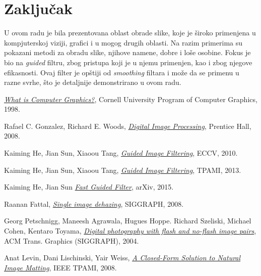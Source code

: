 \documentclass[a4paper,12pt,titlepage]{article}
\begin{document}
\section{Zaključak}%

U ovom radu je bila prezentovana oblast obrade slike, koje je široko primenjena u kompjuterskoj viziji, grafici i u mogog drugih oblasti. Na razim primerima su pokazani metodi za obradu slike, njihove namene, dobre i loše osobine. Fokus je bio na \emph{guided} filtru, zbog pristupa koji je u njemu primenjen, kao i zbog njegove efikasnosti. Ovaj filter je opštiji od \emph{smoothing} filtara i može da se primenu u razne svrhe, što je detaljnije demonstrirano u ovom radu.

\newpage
{}
\begin{thebibliography}{10}

\emph{\href{http://www.graphics.cornell.edu/online/tutorial/}{What is Computer Graphics?}},
Cornell University Program of Computer Graphics,
1998.

Rafael C. Gonzalez, Richard E. Woods,
\emph{\href{https://books.google.rs/books?id=8uGOnjRGEzoC&redir_esc=y}{Digital Image Processing}},
Prentice Hall,
2008.

Kaiming He, Jian Sun, Xiaoou Tang,
\emph{\href{http://kaiminghe.com/publications/eccv10guidedfilter.pdf}{Guided Image Filtering}},
ECCV,
2010.

Kaiming He, Jian Sun, Xiaoou Tang,
\emph{\href{http://kaiminghe.com/publications/pami12guidedfilter.pdf}{Guided Image Filtering}},
TPAMI,
2013.

Kaiming He, Jian Sun
\emph{\href{https://arxiv.org/pdf/1505.00996.pdf}{Fast Guided Filter}},
arXiv,
2015.

Raanan Fattal,
\emph{\href{http://citeseerx.ist.psu.edu/viewdoc/download?doi=10.1.1.456.2558&rep=rep1&type=pdf}{Single image dehazing}},
SIGGRAPH,
2008.

Georg Petschnigg, Maneesh Agrawala, Hugues Hoppe. Richard Szeliski, Michael Cohen, Kentaro Toyama,
\emph{\href{http://hhoppe.com/proj/flash/}{Digital photography with flash and no-flash image pairs}},
ACM Trans. Graphics (SIGGRAPH),
2004.

\bibitem{}
Anat Levin, Dani Lischinski, Yair Weiss,
\emph{\href{http://people.csail.mit.edu/alevin/papers/Matting-Levin-Lischinski-Weiss-PAMI.pdf}{A Closed-Form Solution to Natural
Image Matting}},
IEEE TPAMI,
2008.

\end{thebibliography}
\end{document}
